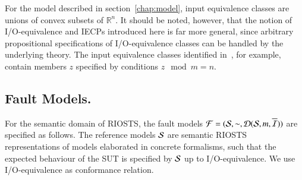 For the model described in section~\ref{chap:model}, input equivalence
classes are unions of convex subsets of $\mathbb{R}^n$. It should be noted, however, that the
notion of I/O-equivalence and IECPs introduced here is far more general, since arbitrary propositional specifications of I/O-equivalence classes can be handled by the 
underlying theory. The input equivalence classes identified in~\cite[Example~1]{peleska_sttt_2014}, for example, contain members 
$z$ specified by conditions $z\!\! \mod m = n$.




\subsection{Fault Models.}

For the semantic domain of RIOSTS,
the fault models ${\cal F} = ({\cal S},\sim,{\cal D}({\cal S},m,\overline{{\cal I}}))$ are specified as follows.
The reference models ${\cal S}$ are semantic RIOSTS representations  of models elaborated in concrete formalisms, such that the expected behaviour of the SUT is specified by ${\cal S}$ up to 
I/O-equivalence. We use  I/O-equivalence as conformance relation.


